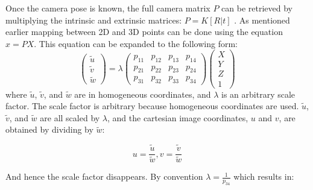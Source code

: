 Once the camera pose is known, the full camera matrix $P$ can be retrieved by multiplying the intrinsic and extrinsic matrices: $P = K[R|t]$ \cite[156]{hartley-zisserman}. 
As mentioned earlier mapping between 2D and 3D points can be done using the equation $x = PX$.
This equation can be expanded to the following form:
$$\begin{pmatrix} \tilde{u} \\ \tilde{v} \\ \tilde{w} \end{pmatrix} = \lambda
\begin{pmatrix} p_{11} & p_{12} & p_{13} & p_{14} \\
 				p_{21} & p_{22} & p_{23} & p_{24} \\
				p_{31} & p_{32} & p_{33} & p_{34} \end{pmatrix}
\begin{pmatrix}X \\Y \\Z \\1\end{pmatrix}$$
where $ \tilde{u}$, $\tilde{v}$, and $\tilde{w}$ are in homogeneous coordinates, and $\lambda$ is an arbitrary scale factor.
The scale factor is arbitrary because homogeneous coordinates are used.
$\tilde{u}$, $\tilde{v}$, and $\tilde{w}$ are all scaled by $\lambda$, and the cartesian image coordinates,  $u$ and $v$, are obtained by dividing by $\tilde{w}$:

$$u = \frac{\tilde{u}}{\tilde{w}}, v = \frac{\tilde{v}}{\tilde{w}}$$

And hence the scale factor disappears. By convention $\lambda = \frac{1}{p_{34}}$ which results in:

